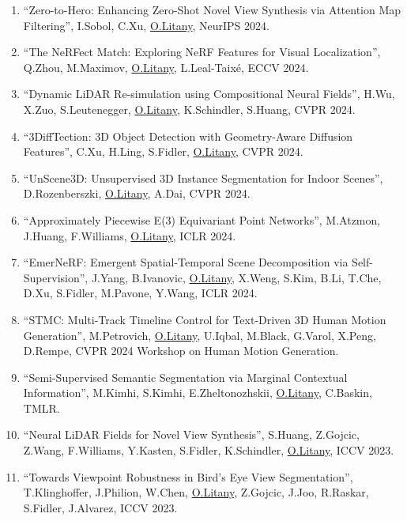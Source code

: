 \begin{enumerate}
\item ``Zero-to-Hero: Enhancing Zero-Shot Novel View Synthesis via Attention Map Filtering'', I.Sobol, C.Xu, \underline{O.Litany}, NeurIPS 2024.

\item ``The NeRFect Match: Exploring NeRF Features for Visual Localization'', Q.Zhou, M.Maximov, \underline{O.Litany}, L.Leal-Taixé, ECCV 2024.

\item ``Dynamic LiDAR Re-simulation using Compositional Neural Fields'', H.Wu, X.Zuo, S.Leutenegger, \underline{O.Litany}, K.Schindler, S.Huang, CVPR 2024.

\item ``3DiffTection: 3D Object Detection with Geometry-Aware Diffusion Features'', C.Xu, H.Ling, S.Fidler, \underline{O.Litany}, CVPR 2024.

\item ``UnScene3D: Unsupervised 3D Instance Segmentation for Indoor Scenes'', D.Rozenberszki, \underline{O.Litany}, A.Dai, CVPR 2024.

\item ``Approximately Piecewise {E(3)} Equivariant Point Networks'', M.Atzmon, J.Huang, F.Williams, \underline{O.Litany}, ICLR 2024.

\item ``EmerNeRF: Emergent Spatial-Temporal Scene Decomposition via Self-Supervision'', J.Yang, B.Ivanovic, \underline{O.Litany}, X.Weng, S.Kim, B.Li, T.Che, D.Xu, S.Fidler, M.Pavone, Y.Wang, ICLR 2024.

\item ``{STMC}: Multi-Track Timeline Control for Text-Driven 3D Human Motion Generation'', M.Petrovich, \underline{O.Litany}, U.Iqbal, M.Black, G.Varol, X.Peng, D.Rempe, CVPR 2024 Workshop on Human Motion Generation.

\item ``Semi-Supervised Semantic Segmentation via Marginal Contextual Information'', M.Kimhi, S.Kimhi, E.Zheltonozhskii, \underline{O.Litany}, C.Baskin, TMLR.

\item ``Neural LiDAR Fields for Novel View Synthesis'', S.Huang, Z.Gojcic, Z.Wang, F.Williams, Y.Kasten, S.Fidler, K.Schindler, \underline{O.Litany}, ICCV 2023.

\item ``Towards Viewpoint Robustness in Bird’s Eye View Segmentation'', T.Klinghoffer, J.Philion, W.Chen, \underline{O.Litany}, Z.Gojcic, J.Joo, R.Raskar, S.Fidler, J.Alvarez, ICCV 2023.


\end{enumerate}
